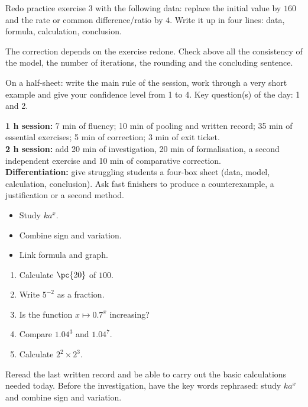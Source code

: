 
\begin{homework}Redo practice exercise 3 with the following data: replace the initial value by $160$ and the rate or common difference/ratio by $4$. Write it up in four lines: data, formula, calculation, conclusion.\end{homework}
\begin{solution}The correction depends on the exercise redone. Check above all the consistency of the model, the number of iterations, the rounding and the concluding sentence.\end{solution}

\begin{exitticket}[3 minutes]On a half-sheet: write the main rule of the session, work through a very short example and give your confidence level from 1 to 4. Key question(s) of the day: 1 and 2.\end{exitticket}

\ifmxteacher
\begin{method}
\textbf{1 h session:} 7 min of fluency; 10 min of pooling and written record; 35 min of essential exercises; 5 min of correction; 3 min of exit ticket.\\
\textbf{2 h session:} add 20 min of investigation, 20 min of formalisation, a second independent exercise and 10 min of comparative correction.\\
\textbf{Differentiation:} give struggling students a four-box sheet (data, model, calculation, conclusion). Ask fast finishers to produce a counterexample, a justification or a second method.
\end{method}
\fi
{}
\begin{objectives}\begin{itemize}\item Study $ka^x$.\item Combine sign and variation.\item Link formula and graph.\end{itemize}\end{objectives}
\begin{fluency}\begin{enumerate}\item Calculate $\pc{20}$ of $100$. \item Write $5^{-2}$ as a fraction. \item Is the function $x\mapsto\num{0,7}^x$ increasing? \item Compare $\num{1,04}^3$ and $\num{1,04}^7$. \item Calculate $2^2\times2^3$. \end{enumerate}\end{fluency}
\begin{prerequisites}Reread the last written record and be able to carry out the basic calculations needed today. Before the investigation, have the key words rephrased: study $ka^x$ and combine sign and variation.\end{prerequisites}

